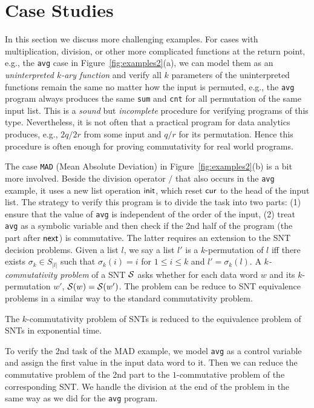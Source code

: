 \section{Case Studies}
\label{sec:cases}


	
In this section we discuss more challenging examples. 
For cases with multiplication, division, or other more complicated functions at the return point, e.g., the \texttt{avg} case in Figure~\ref{fig:examples2}(a), we can model them as an \emph{uninterpreted $k$-ary function} and verify all $k$ parameters of the uninterpreted functions remain the same no matter how the input is permuted, e.g., the \texttt{avg} program always produces the same \texttt{sum} and \texttt{cnt} for all permutation of the same input list. This is a \emph{sound} but \emph{incomplete} procedure for verifying programs of this type. Nevertheless, it is not often that a  practical program for data analytics produces, e.g., $2q/2r$ from some input and $q/r$ for its permutation. Hence this procedure is often enough for proving commutativity for real world programs.

The case \texttt{MAD} (Mean Absolute Deviation) in Figure~\ref{fig:examples2}(b) is a bit more involved. Beside the division operator $/$ that also occurs in the \texttt{avg} example, it uses a new list operation $\mathsf{init}$, which reset $\mathsf{cur}$ to the head of the input list. The strategy to verify this program is to divide the task into two parts: (1) ensure that the value of \texttt{avg} is independent of the order of the input, (2) treat \texttt{avg} as a symbolic variable and then check if the 2nd half of the program (the part after $\mathsf{next}$) is commutative. The latter requires an extension to the SNT decision problems. Given a list $l$, we say a list $l'$ is a $k$-permutation of $l$ iff there exists $\sigma_k\in S_{|l|}$ such that $\sigma_k(i)=i$ for $1\leq i\leq k$ and $l'=\sigma_k(l)$. A \emph{$k$-commutativity problem} of a SNT ${\mathcal{S} }$ asks whether for each data word $w$ and its $k$-permutation $w'$, ${\mathcal{S} }(w)={\mathcal{S} }(w')$. The problem can be reduce to SNT equivalence problems in a similar way to the standard commutativity problem.

\begin{proposition}\label{prop-snt-kcmm-to-eqv}
	The $k$-commutativity problem of SNTs is reduced to the equivalence problem of SNTs in exponential time. 
\end{proposition}

To verify the 2nd task of the MAD example, we model \texttt{avg} as a control variable and assign the first value in the input data word to it. Then we can reduce the commutative problem of the 2nd part to the $1$-commutative problem of the corresponding SNT. We handle the division at the end of the problem in the same way as we did for the \texttt{avg} program.


